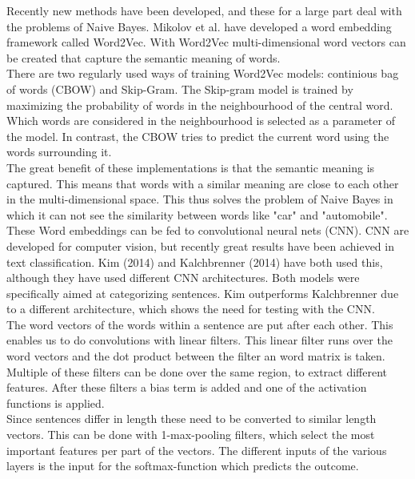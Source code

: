 \documentclass[a4paper]{article}
\begin{document}
Recently new methods have been developed, and these for a large part deal with the problems of Naive Bayes. Mikolov et al. have developed a word embedding framework called Word2Vec. With Word2Vec multi-dimensional word vectors can be created that capture the semantic meaning of words. \cite{mikolov2013efficient} \\
There are two regularly used ways of training Word2Vec models: continious bag of words (CBOW) and Skip-Gram. The Skip-gram model is trained by maximizing the probability of words in the neighbourhood of the central word. Which words are considered in the neighbourhood is selected as a parameter of the model. In contrast, the CBOW tries to predict the current word using the words surrounding it.\cite{mikolov2013efficient} \\ 
The great benefit of these implementations is that the semantic meaning is captured. This means that words with a similar meaning are close to each other in the multi-dimensional space. This thus solves the problem of Naive Bayes in which it can not see the similarity between words like "car" and "automobile".
These Word embeddings can be fed to convolutional neural nets (CNN). CNN are developed for computer vision, but recently great results have been achieved in text classification. Kim (2014) and Kalchbrenner (2014) have both used this, although they have used different CNN architectures. Both models were specifically aimed at categorizing sentences. Kim outperforms Kalchbrenner due to a different architecture, which shows the need for testing with the CNN. \cite{kim2014convolutional,kalchbrenner2014convolutional} \\
The word vectors of the words within a sentence are put after each other. This enables us to do convolutions with linear filters. This linear filter runs over the word vectors and the dot product between the filter an word matrix is taken. Multiple of these filters can be done over the same region, to extract different features. After these filters a bias term is added and one of the activation functions is applied. \cite{zhang2015sensitivity}\\
Since sentences differ in length these need to be converted to similar length vectors. This can be done with 1-max-pooling filters, which select the most important features per part of the vectors. The different inputs of the various layers is the input for the softmax-function which predicts the outcome. \cite{zhang2015sensitivity}
	
\end{document}
